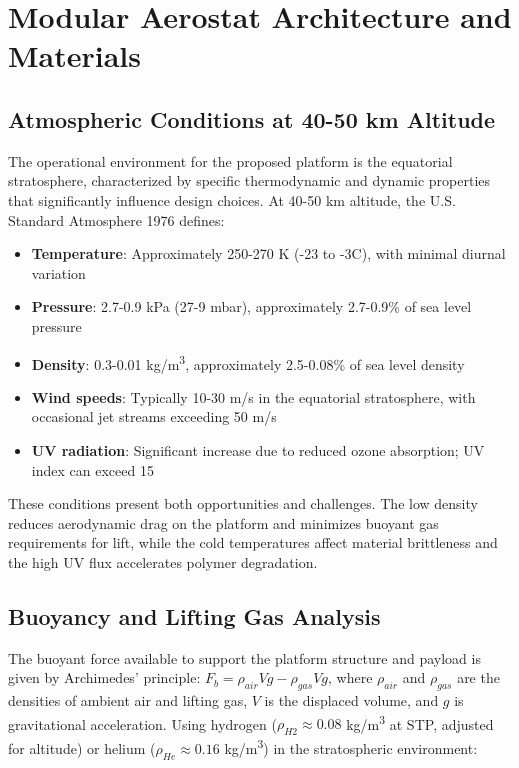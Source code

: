 \documentclass[12pt]{article}
\begin{document}
\section{Modular Aerostat Architecture and Materials}
\label{sec:aerostat}

\subsection{Atmospheric Conditions at 40-50 km Altitude}
The operational environment for the proposed platform is the equatorial stratosphere, characterized by specific thermodynamic and dynamic properties that significantly influence design choices. At 40-50 km altitude, the U.S. Standard Atmosphere 1976 \cite{ussa1976} defines:
\begin{itemize}
    \item \textbf{Temperature}: Approximately 250-270 K (-23 to -3\textdegree{}C), with minimal diurnal variation
    \item \textbf{Pressure}: 2.7-0.9 kPa (27-9 mbar), approximately 2.7-0.9\% of sea level pressure
    \item \textbf{Density}: 0.3-0.01 kg/m\textsuperscript{3}, approximately 2.5-0.08\% of sea level density
    \item \textbf{Wind speeds}: Typically 10-30 m/s in the equatorial stratosphere, with occasional jet streams exceeding 50 m/s \cite{holton2004}
    \item \textbf{UV radiation}: Significant increase due to reduced ozone absorption; UV index can exceed 15 \cite{blumthaler1997}
\end{itemize}
These conditions present both opportunities and challenges. The low density reduces aerodynamic drag on the platform and minimizes buoyant gas requirements for lift, while the cold temperatures affect material brittleness and the high UV flux accelerates polymer degradation.

\subsection{Buoyancy and Lifting Gas Analysis}
The buoyant force available to support the platform structure and payload is given by Archimedes' principle: $F_b = \rho_{air} V g - \rho_{gas} V g$, where $\rho_{air}$ and $\rho_{gas}$ are the densities of ambient air and lifting gas, $V$ is the displaced volume, and $g$ is gravitational acceleration. Using hydrogen ($\rho_{H2} \approx 0.08$ kg/m\textsuperscript{3} at STP, adjusted for altitude) or helium ($\rho_{He} \approx 0.16$ kg/m\textsuperscript{3}) in the stratospheric environment:
\end{document}
